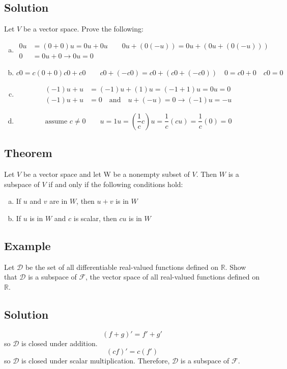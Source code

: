 \subsection*{Solution}
Let $V$ be a vector space. Prove the following:
\begin{enumerate}[(a)]
    \item \begin{align*}
              0u & =(0+0)u=0u+0u \qquad 0u+(0(-u))=0u+(0u+(0(-u))) \\
              0  & =0u+0\to0u=0
          \end{align*}
    \item \[c0=c(0+0)c0+c0 \qquad c0+(-c0)=c0+(c0+(-c0)) \quad 0=c0+0 \quad c0=0\]
    \item \begin{align*}
              (-1)u+u & =(-1)u+(1)u=(-1+1)u=0u=0                      \\
              (-1)u+u & =0 \quad \text{and} \quad u+(-u)=0\to(-1)u=-u
          \end{align*}
    \item \[\text{assume } c\neq0 \qquad u=1u=\left(\frac{1}{c}c\right)u=\frac{1}{c}(cu)=\frac{1}{c}(0)=0\]
\end{enumerate}

\subsection*{Theorem}
Let $V$ be a vector space and let W be a nonempty subset of $V$.
Then $W$ is a subspace of $V$ if and only if the following conditions hold:
\begin{enumerate}[(a)]
    \item If $u$ and $v$ are in $W$, then $u + v$ is in $W$
    \item If $u$ is in $W$ and $c$ is scalar, then $cu$ is in $W$
\end{enumerate}

\subsection*{Example}
Let $\mathscr{D}$ be the set of all differentiable real-valued functions defined on
$\mathbb{R}$. Show that $\mathscr{D}$ is a subspace of $\mathscr{F}$, the vector
space of all real-valued functions defined on $\mathbb{R}$.

\subsection*{Solution}
\[(f+g)'=f'+g'\]
so $\mathscr{D}$ is closed under addition.
\[(cf)'=c(f')\]
so $\mathscr{D}$ is closed under scalar multiplication. Therefore, $\mathscr{D}$
is a subspace of $\mathscr{F}$.

